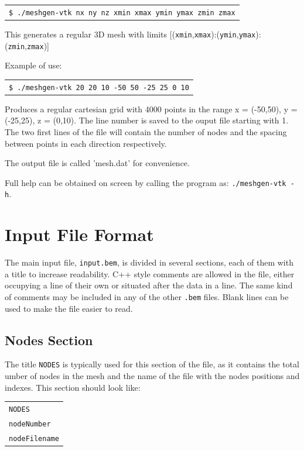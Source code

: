 \documentclass[12pt]{report}
\begin{document}
\begin{tabular}{l}
\texttt{\$ ./meshgen-vtk nx ny nz xmin xmax ymin ymax zmin zmax}
\end{tabular}

This generates a regular 3D mesh with limits [(\verb+xmin+,\verb+xmax+):(\verb+ymin+,\verb+ymax+):(\verb+zmin+,\verb+zmax+)]

Example of use:

\begin{tabular}{l}
\texttt{\$ ./meshgen-vtk 20 20 10 -50 50 -25 25 0 10}
\end{tabular}

Produces a regular cartesian grid with 4000 points in the range x = (-50,50), y = (-25,25), z = (0,10). The line number is saved to the ouput file starting with 1. The two first lines of the file will contain the number of nodes and the spacing between points in each direction respectively.

The output file is called 'mesh.dat' for convenience.

Full help can be obtained on screen by calling the program as: \texttt{./meshgen-vtk -h}.

\pagebreak
\section*{}
\pagebreak

\chapter{Input File Format}
The main input file, \verb+input.bem+, is divided in several sections, each of them with a title to increase readability. C++ style comments are allowed in the file, either occupying a line of their own or situated after the data in a line. The same kind of comments may be included in any of the other \verb+.bem+ files. Blank lines can be used to make the file easier to read.

\section{Nodes Section}
The title \verb+NODES+ is typically used for this section of the file, as it contains the total umber of nodes in the mesh and the name of the file with the nodes positions and indexes. This section should look like:

\begin{tabular}{l}
\texttt{NODES}\\
\texttt{nodeNumber}\\
\texttt{nodeFilename}
\end{tabular}
\end{document}
